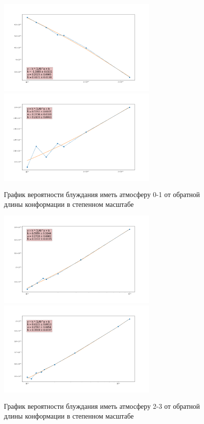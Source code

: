 \begin{figure}[h]
\centering
\includegraphics[width=0.7\textwidth]{Sections/Images_2/p0_res.png}
\includegraphics[width=0.7\textwidth]{Sections/Images_2/p1_res.png}
\caption{График вероятности блуждания иметь атмосферу 0-1 от обратной длины конформации в степенном масштабе}
\label{fig:p_01_loglog}
\end{figure}

\begin{figure}[h]
\centering
\includegraphics[width=0.7\textwidth]{Sections/Images_2/p2_res.png}
\includegraphics[width=0.7\textwidth]{Sections/Images_2/p3_res.png}
\caption{График вероятности блуждания иметь атмосферу 2-3 от обратной длины конформации в степенном масштабе}
\label{fig:p_23_loglog}
\end{figure}

